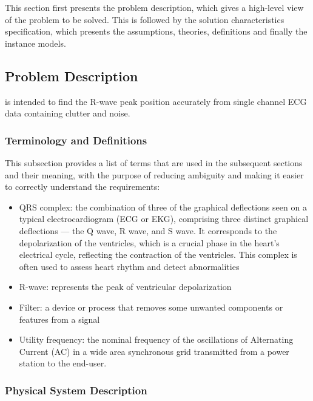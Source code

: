 \documentclass[12pt]{article}
\begin{document}
This section first presents the problem description, which gives a high-level
view of the problem to be solved.  This is followed by the solution
characteristics specification, which presents the assumptions, theories,
definitions and finally the instance models.

\subsection{Problem Description} \label{Sec_pd}

\progname{} is intended to find the R-wave peak position accurately from single
channel ECG data containing clutter and noise.

\subsubsection{Terminology and  Definitions}

This subsection provides a list of terms that are used in the subsequent
sections and their meaning, with the purpose of reducing ambiguity and making it
easier to correctly understand the requirements:

\begin{itemize}

\item QRS complex: the combination of three of the graphical deflections seen on
a typical electrocardiogram (ECG or EKG)\cite{wiki:QRS_complex}, comprising
three distinct graphical deflections — the Q wave, R wave, and S wave. It
corresponds to the depolarization of the ventricles, which is a crucial phase in
the heart's electrical cycle, reflecting the contraction of the ventricles. This
complex is often used to assess heart rhythm and detect abnormalities
\item R-wave: represents the peak of ventricular depolarization
\item Filter: a device or process that removes some unwanted components or
features from a signal\cite{wiki:Filter_(signal_processing)}
\item Utility frequency: the nominal frequency of the oscillations of
Alternating Current (AC) in a wide area synchronous grid transmitted from a
power station to the end-user.\cite{wiki:Utility_frequency}

\end{itemize}

\subsubsection{Physical System Description} \label{sec_phySystDescrip}
\end{document}
